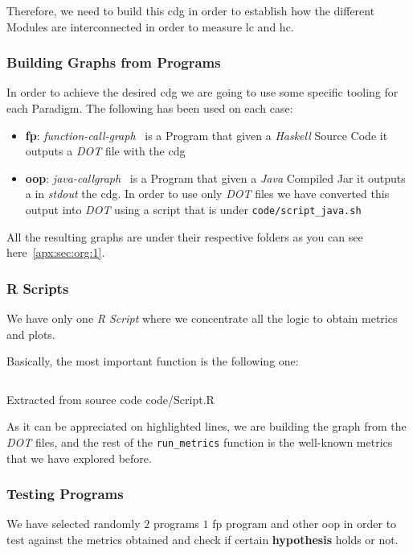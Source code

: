 \documentclass[12pt, a4paper]{article}
\begin{document}
Therefore, we need to build this \acrlong{cdg} in order to establish how the different Modules are interconnected in order to measure \acrshort{lc} and \acrshort{hc}.

\subsubsection{Building Graphs from Programs}
In order to achieve the desired \acrlong{cdg} we are going to use some specific tooling for each Paradigm.
The following has been used on each case:

\begin{itemize}
    \item \textbf{\acrlong{fp}}: \textit{function-call-graph}~\cite{fp_callgraph} is a Program that given a \textit{Haskell} Source Code it outputs a \textit{DOT} file with the \acrlong{cdg}
    \item \textbf{\acrlong{oop}}: \textit{java-callgraph}~\cite{java_callgraph} is a Program that given a \textit{Java} Compiled Jar it outputs a in \textit{stdout} the \acrlong{cdg}. In order to use only \textit{DOT} files we have converted this output into \textit{DOT} using a script that is under \texttt{code/script_java.sh}
\end{itemize}

All the resulting graphs are under their respective folders as you can see here~\ref{apx:sec:org:1}.

\subsubsection{R Scripts}
We have only one \textit{R Script} where we concentrate all the logic to obtain metrics and plots. 

Basically, the most important function is the following one:

\begin{listing}[H]
    \inputminted[firstline=18, lastline=46, breaklines, highlightlines={19-23}]{R}{../code/Solution.R}
    \caption{Extracted from source code code/Script.R}
    \label{src:script:1}
\end{listing}
  
As it can be appreciated on highlighted lines, we are building the graph from the \textit{DOT} files, 
and the rest of the \texttt{run_metrics} function is the well-known metrics that we have explored before.   

\subsubsection{Testing Programs}
We have selected randomly $2$ programs $1$ \acrfull{fp} program and other \acrfull{oop} in order to test against
the metrics obtained and check if certain \textbf{hypothesis} holds or not.
\end{document}
